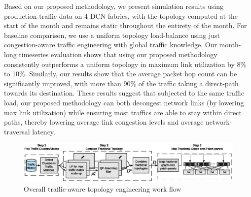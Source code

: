 \documentclass[sigconf]{acmart}
\theoremstyle{definition}
\begin{document}
Based on our proposed methodology, we present simulation results using production traffic data on 4 DCN fabrics, with the topology computed at the start of the month and remains static throughout the entirety of the month. For baseline comparison, we use a uniform topology load-balance using just congestion-aware traffic engineering with global traffic knowledge. Our month-long timeseries evaluation shows that using our proposed methodology consistently outperforms a uniform topology in maximum link utilization by 8\% to 10\%. Similarly, our results show that the average packet hop count can be significantly improved, with more than 90\% of the traffic taking a direct-path towards its destination. These results suggest that subjected to the same traffic load, our proposed methodology can both decongest network links (by lowering max link utilization) while ensuring most traffics are able to stay within direct paths, thereby lowering average link congestion levels and average network-traversal latency. 

\begin{figure}[ht!]
\centering
\includegraphics[trim={0.5cm 0.8cm 0.1cm 0.7cm}, width=\textwidth, scale=1.2]{figures/topology_engineering_overall_algorithm} 
\caption{Overall traffic-aware topology engineering work flow}
\label{topology_engineering_overall_workflow}
\end{figure}
\end{document}
